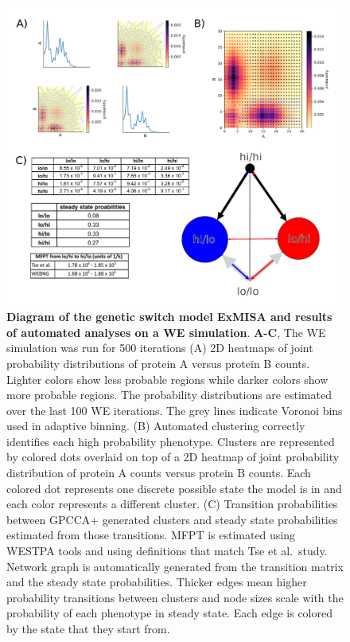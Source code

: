 \documentclass[10pt,letterpaper]{article}
\begin{document}

\begin{figure}[h!] %
\centering
\includegraphics[width=\textwidth]{fig3.pdf}
\caption{\color{Gray} \textbf{Diagram of the genetic switch model ExMISA\cite{TseRead} and results of automated analyses on a WE simulation}. \textbf{A-C}, The WE simulation was run for 500 iterations (A) 2D heatmaps of joint probability distributions of protein A versus protein B counts. Lighter colors show less probable regions while darker colors show more probable regions. The probability distributions are estimated over the last 100 WE iterations. The grey lines indicate Voronoi bins used in adaptive binning. (B) Automated clustering correctly identifies each high probability phenotype. Clusters are represented by colored dots overlaid on top of a 2D heatmap of joint probability distribution of protein A counts versus protein B counts. Each colored dot represents one discrete possible state the model is in and each color represents a different cluster. (C) Transition probabilities between GPCCA+ generated clusters and steady state probabilities estimated from those transitions. MFPT is estimated using WESTPA tools and using definitions that match Tse et al.\ study. Network graph is automatically generated from the transition matrix and the steady state probabilities. Thicker edges mean higher probability transitions between clusters and node sizes scale with the probability of each phenotype in steady state. Each edge is colored by the state that they start from.}


\end{figure}
\end{document}
